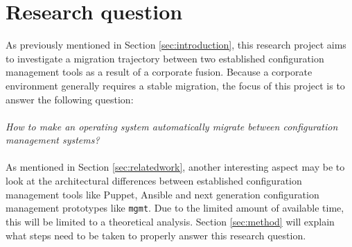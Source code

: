 \section{Research question}\label{sec:researchquestion}
As previously mentioned in Section \ref{sec:introduction}, this research project aims to investigate a migration trajectory between two established configuration management tools as a result of a corporate fusion. Because a corporate environment generally requires a stable migration, the focus of this project is to answer the following question:
\\\\
\textit{How to make an operating system automatically migrate between configuration management systems?}
\\\\
As mentioned in Section \ref{sec:relatedwork}, another interesting aspect may be to look at the architectural differences between established configuration management tools like Puppet, Ansible and next generation configuration management prototypes like \texttt{mgmt}. Due to the limited amount of available time, this will be limited to a theoretical analysis. Section \ref{sec:method} will explain what steps need to be taken to properly answer this research question.
